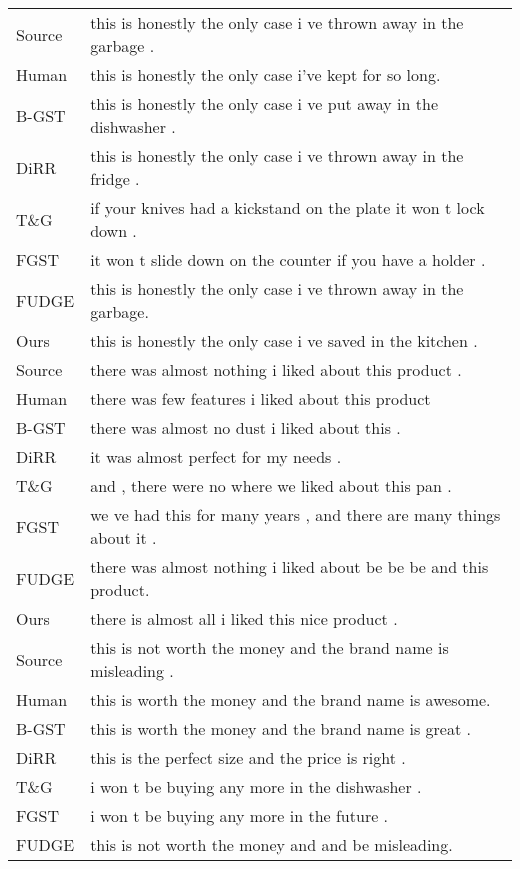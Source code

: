 \documentclass[11pt]{article}
\begin{document}
\begin{table}[ht]
    \centering
    \footnotesize
\vspace{-10pt}
    \begin{tabular}{ll}
\toprule
Source&this is honestly the only case i ve thrown away in the garbage .\\
Human&this is honestly the only case i've kept for so long.\\
\midrule
B-GST&this is honestly the only case i ve put away in the dishwasher .\\
DiRR&this is honestly the only case i ve thrown away in the fridge .\\
T\&G&if your knives had a kickstand on the plate it won t lock down .\\
FGST&it won t slide down on the counter if you have a holder .\\\midrule
FUDGE&this is honestly the only case i ve thrown away in the garbage.\\
Ours&this is honestly the only case i ve saved in the kitchen .\\
\midrule[1pt]
Source&there was almost nothing i liked about this product .\\
Human&there was few features i liked about this product\\
\midrule
B-GST&there was almost no dust i liked about this .\\
DiRR&it was almost perfect for my needs .\\
T\&G&and , there were no where we liked about this pan .\\
FGST&we ve had this for many years , and there are many things about it .\\\midrule
FUDGE&there was almost nothing i liked about be be be and this product.\\
Ours&there is almost all i liked this nice product .\\
\midrule[1pt]
Source&this is not worth the money and the brand name is misleading .\\
Human&this is worth the money and the brand name is awesome.\\
\midrule
B-GST&this is worth the money and the brand name is great .\\
DiRR&this is the perfect size and the price is right .\\
T\&G&i won t be buying any more in the dishwasher .\\
FGST&i won t be buying any more in the future .\\\midrule
FUDGE&this is not worth the money and and be misleading.\\

\end{tabular}
\end{table}
\end{document}
